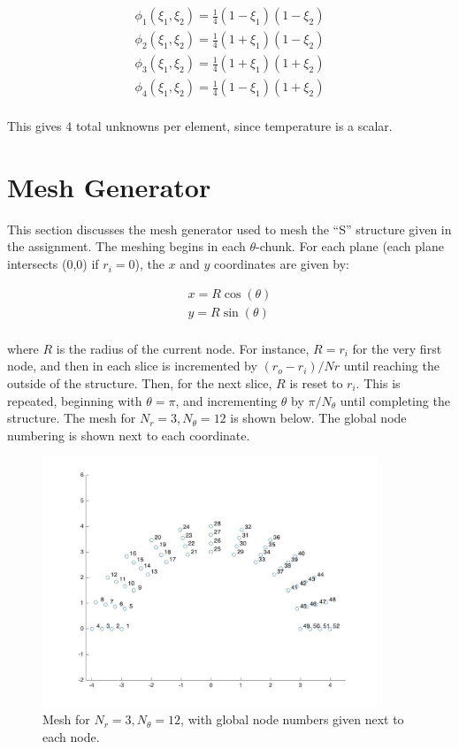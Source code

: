 \documentclass[10pt]{article}
\begin{document}
\begin{equation}
\label{eq:Bricks}
\begin{aligned}
\phi_1(\xi_1,\xi_2)=\frac{1}{4}(1-\xi_1)(1-\xi_2)\\
\phi_2(\xi_1,\xi_2)=\frac{1}{4}(1+\xi_1)(1-\xi_2)\\
\phi_3(\xi_1,\xi_2)=\frac{1}{4}(1+\xi_1)(1+\xi_2)\\
\phi_4(\xi_1,\xi_2)=\frac{1}{4}(1-\xi_1)(1+\xi_2)\\
\end{aligned}
\end{equation}

This gives 4 total unknowns per element, since temperature is a scalar.

\section{Mesh Generator}

This section discusses the mesh generator used to mesh the ``S'' structure given in the assignment. The meshing begins in each \(\theta\)-chunk. For each plane (each plane intersects (0,0) if \(r_i=0\)), the \(x\) and \(y\) coordinates are given by:

\begin{equation}
\begin{aligned}
x=R\cos{(\theta)}\\
y=R\sin{(\theta)}\\
\end{aligned}
\end{equation}

where \(R\) is the radius of the current node. For instance, \(R=r_i\) for the very first node, and then in each slice is incremented by \((r_o-r_i)/Nr\) until reaching the outside of the structure. Then, for the next slice, \(R\) is reset to \(r_i\). This is repeated, beginning with \(\theta=\pi\), and incrementing \(\theta\) by \(\pi/N_\theta\) until completing the structure. The mesh for \(N_r=3,N_\theta=12\) is shown below. The global node numbering is shown next to each coordinate.

\begin{figure}[H]
  \centering
  \includegraphics[width=10cm]{Mesh.jpg}
  \caption{Mesh for \(N_r=3, N_\theta=12\), with global node numbers given next to each node.}
  \label{fig:Mesh}
\end{figure}
\end{document}
